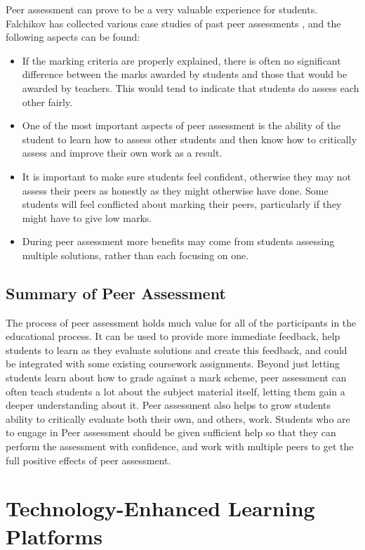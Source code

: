 \documentclass[a4paper,11pt]{report}
\begin{document}
Peer assessment can prove to be a very valuable experience for students. Falchikov has collected various case studies of past peer assessments \cite{falchikov_improving_2013}, and the following aspects can be found:
\begin{itemize}
 \item If the marking criteria are properly explained, there is often no significant difference between the marks awarded by students and those that would be awarded by teachers. This would tend to indicate that students do assess each other fairly.
 \item One of the most important aspects of peer assessment is the ability of the student to learn how to assess other students and then know how to critically assess and improve their own work as a result.
 \item It is important to make sure students feel confident, otherwise they may not assess their peers as honestly as they might otherwise have done. Some students will feel conflicted about marking their peers, particularly if they might have to give low marks.
 \item During peer assessment more benefits may come from students assessing multiple solutions, rather than each focusing on one.
\end{itemize}

\subsection{Summary of Peer Assessment}
The process of peer assessment holds much value for all of the participants in the educational process. It can be used to provide more immediate feedback, help students to learn as they evaluate solutions and create this feedback, and could be integrated with some existing coursework assignments. Beyond just letting students learn about how to grade against a mark scheme, peer assessment can often teach students a lot about the subject material itself, letting them gain a deeper understanding about it. Peer assessment also helps to grow students ability to critically evaluate both their own, and others, work. Students who are to engage in Peer assessment should be given sufficient help so that they can perform the assessment with confidence, and work with multiple peers to get the full positive effects of peer assessment.


\section{Technology-Enhanced Learning Platforms}
\end{document}
